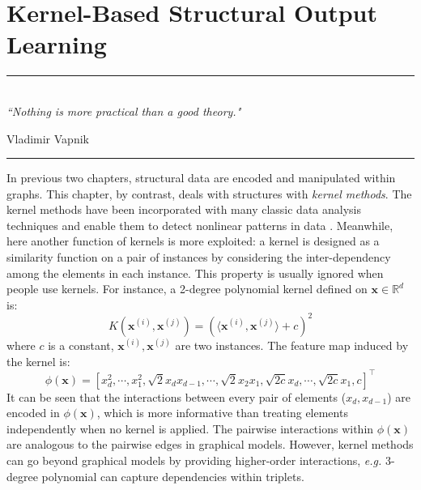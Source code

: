 
\chapter{Kernel-Based Structural Output Learning} %
\label{Chapter4} %

\rule{\textwidth}{0.4pt} \\[0.5cm]
\textit{``Nothing is more practical than a good theory."}

\begin{flushright}
Vladimir Vapnik
\end{flushright}
\rule{\textwidth}{0.4pt} 

In previous two chapters, structural data are encoded and manipulated within graphs. This chapter, by contrast, 
deals with structures with \emph{kernel methods}. The kernel methods have been incorporated with many classic data analysis 
techniques and enable them to detect nonlinear patterns in 
data \citep{citeulike:Taylor_Nello_Kernel}.   
Meanwhile, here another function of kernels is more exploited: a kernel is designed as a similarity function on a pair of instances by  
considering the inter-dependency among the elements in each instance. This property is usually ignored when people use kernels.   
For instance, a 2-degree polynomial kernel defined on $\mathbf{x}\in\mathbb{R}^d$ is:
\begin{equation}
    K(\mathbf{x}^{(i)},\mathbf{x}^{(j)})=\left(\langle \mathbf{x}^{(i)},\mathbf{x}^{(j)} \rangle +c\right)^2
\label{equ:pol_kernel}
\end{equation}
where $c$ is a constant, $\mathbf{x}^{(i)},\mathbf{x}^{(j)}$ are two instances. The feature map induced by the kernel is:      
\begin{equation}
    \phi(\mathbf{x})=[x_d^2,\cdots,x_1^2, \sqrt{2}x_d x_{d-1}, \cdots, \sqrt{2}x_2 x_{1}, \sqrt{2c}x_d,\cdots, \sqrt{2c}x_1,c]^\top 
     \label{equ:pol_feature_map}
\end{equation}
It can be seen that the interactions between every pair of elements ($x_d, x_{d-1}$) are encoded in $\phi(\mathbf{x})$, which is 
more informative than treating elements independently when no kernel is applied.  
The pairwise interactions within $\phi(\mathbf{x})$ are analogous to the pairwise edges in graphical models. However, kernel methods can go beyond graphical models by providing 
higher-order interactions, \emph{e.g.} 3-degree polynomial can capture dependencies within triplets.  

